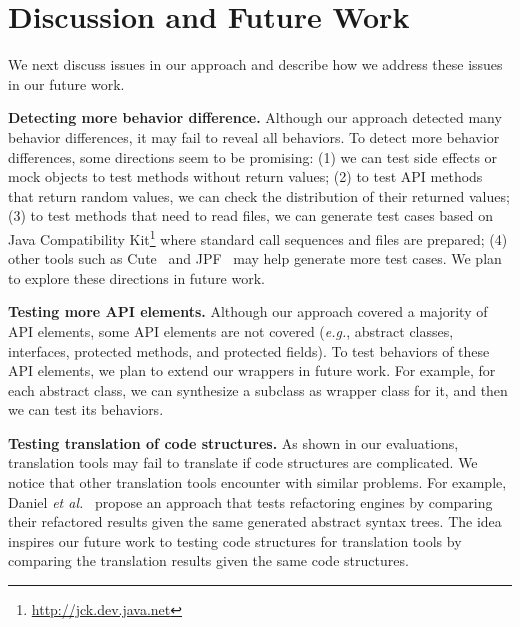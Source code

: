 

\section{Discussion and Future Work}
\label{sec:discuss}

We next discuss issues in our approach and describe how we address
these issues in our future work.

\textbf{Detecting more behavior difference.} Although our approach detected many behavior differences, it may fail to reveal all behaviors. To detect more behavior differences, some directions seem to be promising: (1) we can test side effects or  mock objects to test methods without return values; (2) to test API methods that return random values, we can check the distribution of their returned values; (3) to test methods that need to read files, we can generate test cases based on Java Compatibility Kit\footnote{\url{http://jck.dev.java.net}} where standard call sequences and files are prepared; (4) other tools such as Cute~\cite{koushik:cute} and JPF~\cite{visser2003mcp} may help generate more test cases. We plan to explore these directions in future work.

\textbf{Testing more API elements.} Although our approach covered a majority of API elements, some API elements are not covered (\emph{e.g.}, abstract classes, interfaces, protected methods, and protected fields). To test behaviors of these API elements, we plan to extend our wrappers in future work. For example, for each abstract class, we can synthesize a subclass as wrapper class for it, and then we can test its behaviors.

\textbf{Testing translation of code structures.} As shown in our evaluations, translation tools may fail to translate if code structures are complicated. We notice that other translation tools encounter with similar problems. For example, Daniel \emph{et al.}~\cite{daniel2007automated} propose an approach that tests refactoring engines by comparing their refactored results given the same generated abstract syntax trees. The idea inspires our future work to testing code structures for translation tools by comparing the translation results given the same code structures.

